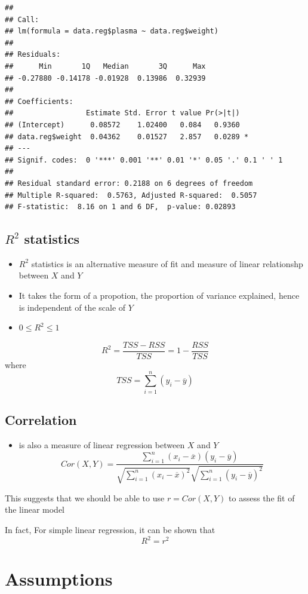 \documentclass[]{article}
\providecommand{\tightlist}{%
  \setlength{\itemsep}{0pt}\setlength{\parskip}{0pt}}
\begin{document}
\begin{verbatim}
## 
## Call:
## lm(formula = data.reg$plasma ~ data.reg$weight)
## 
## Residuals:
##      Min       1Q   Median       3Q      Max 
## -0.27880 -0.14178 -0.01928  0.13986  0.32939 
## 
## Coefficients:
##                 Estimate Std. Error t value Pr(>|t|)  
## (Intercept)      0.08572    1.02400   0.084   0.9360  
## data.reg$weight  0.04362    0.01527   2.857   0.0289 *
## ---
## Signif. codes:  0 '***' 0.001 '**' 0.01 '*' 0.05 '.' 0.1 ' ' 1
## 
## Residual standard error: 0.2188 on 6 degrees of freedom
## Multiple R-squared:  0.5763, Adjusted R-squared:  0.5057 
## F-statistic:  8.16 on 1 and 6 DF,  p-value: 0.02893
\end{verbatim}

\hypertarget{r2-statistics}{%
\subsection{\texorpdfstring{\(R^2\)
statistics}{R\^{}2 statistics}}\label{r2-statistics}}

\begin{itemize}
\tightlist
\item
  \(R^2\) statistics is an alternative measure of fit and measure of
  linear relationshp between \(X\) and \(Y\)
\item
  It takes the form of a propotion, the proportion of variance
  explained, hence is independent of the scale of \(Y\)
\item
  \(0 \leq R^2 \leq 1\)
\end{itemize}

\[R^2=\frac{TSS-RSS}{TSS}=1-\frac{RSS}{TSS}\] where
\[TSS=\sum_{i=1}^{n}(y_i-\overline{y})\]

\hypertarget{correlation}{%
\subsection{Correlation}\label{correlation}}

\begin{itemize}
\tightlist
\item
  is also a measure of linear regression between \(X\) and \(Y\)
  \[Cor(X,Y)=\frac{\sum_{i=1}^{n}(x_i-\overline{x})(y_i-\overline{y})}{\sqrt{\sum_{i=1}^{n}(x_i-\overline{x})^2}\sqrt{\sum_{i=1}^{n}(y_i-\overline{y})^2}}\]
\end{itemize}

This suggests that we should be able to use \(r=Cor(X,Y)\) to assess the
fit of the linear model

In fact, For simple linear regression, it can be shown that \[R^2=r^2\]

\hypertarget{assumptions}{%
\section{Assumptions}\label{assumptions}}
\end{document}
